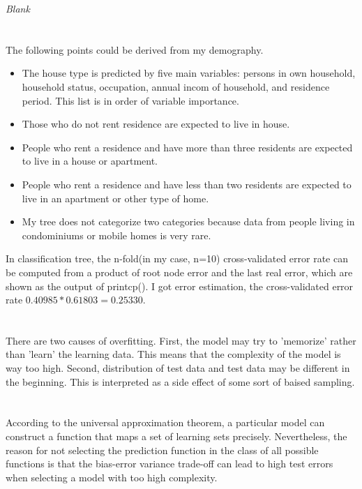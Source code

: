 \documentclass[11pt,a4paper]{article}
\begin{document}
\emph{Blank}

\section{}

The following points could be derived from my demography.
\begin{itemize}
\item The house type is predicted by five main variables: persons in own household, household status, occupation, annual incom of household, and residence period. This list is in order of variable importance.
\item Those who do not rent residence are expected to live in house.
\item People who rent a residence and have more than three residents are expected to live in a house or apartment.
\item People who rent a residence and have less than two residents are expected to live in an apartment or other type of home.
\item My tree does not categorize two categories because data from people living in condominiums or mobile homes is very rare.
\end{itemize}
In classification tree, the n-fold(in my case, n=10) cross-validated error rate can be computed from a product of root node error and the last real error, which are shown as the output of printcp(). I got error estimation, the cross-validated error rate \(0.40985*0.61803 = 0.25330\).

\section{}

There are two causes of overfitting. First, the model may try to 'memorize' rather than 'learn' the learning data. This means that the complexity of the model is way too high. Second, distribution of test data and test data may be different in the beginning. This is interpreted as a side effect of some sort of baised sampling.

\section{}

According to the universal approximation theorem, a particular model can construct a function that maps a set of learning sets precisely. Nevertheless, the reason for not selecting the prediction function in the class of all possible functions is that the bias-error variance trade-off can lead to high test errors when selecting a model with too high complexity.
\end{document}
